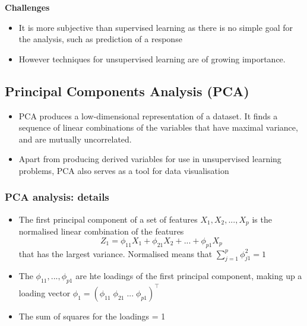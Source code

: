 \documentclass{article}
\begin{document}
\noindent\textbf{Challenges}
\begin{itemize}
    \item It is more subjective than supervised learning as there is no simple goal for the analysis, such as prediction of a response
    \item However techniques for unsupervised learning are of growing importance.
\end{itemize}



\subsection{Principal Components Analysis (PCA)}

\begin{itemize}
    \item PCA produces a low-dimensional representation of a dataset. It finds a sequence of linear combinations of the variables that have maximal variance, and are mutually uncorrelated.
    \item Apart from producing derived variables for use in unsupervised learning problems, PCA also serves as a tool for data visualisation
\end{itemize}


\subsubsection{PCA analysis: details}
\begin{itemize}
    \item The first principal component of a set of features $X_1, X_2, ..., X_p$ is the normalised linear combination of the features
    \begin{equation*}
        Z_1 = \phi_{11}X_1 + \phi_{21} X_2 + ... + \phi_{p1} X_p
    \end{equation*}
    that has the largest variance. Normalised means that $\sum_{j=1}^p \phi_{j1}^2 = 1$
    \item The $\phi_11, ..., \phi_{p1}$ are hte loadings of the first principal component, making up a loading vector $\phi_1 = (\phi_{11} \; \phi_{21} \; ... \; \phi_{p1})^\top$
    \item The sum of squares for the loadings = 1
\end{itemize}
\end{document}
